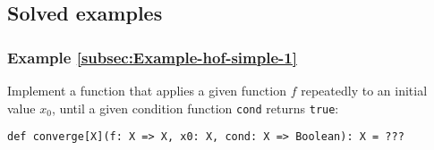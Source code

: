 \begin{comment}
whose first argument is yes parentheses so let's copy that so this
must equal this if that can be matched with some choice of ABC F T
then we're done there are no other problems how can this be matched
so again the only way that this can be matched is when the left is
a function of some X to some Y and the right also is a function from
some X to some one the same x and y now the left is a function from
this to see the right is a function from F to this remember there's
implicitly there are these parentheses here therefore f must equal
this and C must equal this okay can we do this of course we can F
can be equal to this and once that is true C must be equal to that
so let's put parentheses here and I'll paste it in alright so now
we can put this instead of F in here so that's right code actually
some parameters C T whatever actually C will be equal to that so a
B and T will remain and then we get QQ of a B C of Q of F C right
now let's paste so f is equal to this and C is equal to that and now
everything is green so now we can do option enter here and it will
infer the type so the type of this expression is actually this which
is the same as the type of QQ up to changing C 2 T so we can rename
this to C and it will be exactly the same type so this is very interesting
we we have Q of Q of this type and Q of Q of Q is again of this type
so clearly we can continue doing this Q of Q of Q of Q of Q and it
will still have the same type up to some complicated substitutions
in the types now this example I admit is quite artificial but this
serves to show you how type reasoning works here are some exercises
for you and you can apply the typed reasoning as I just showed you
in the same way and I encourage you to do these exercises 
\end{comment}


\subsection{Solved examples}

\subsubsection{Example \label{subsec:Example-hof-simple-1}\ref{subsec:Example-hof-simple-1}}

Implement a function that applies a given function $f$ repeatedly
to an initial value $x_{0}$, until a given condition function \lstinline!cond!
returns \lstinline!true!:
\begin{lstlisting}
def converge[X](f: X => X, x0: X, cond: X => Boolean): X = ???
\end{lstlisting}


